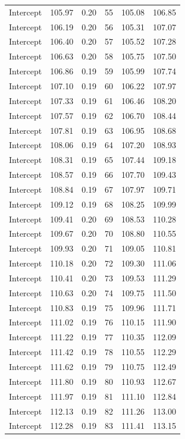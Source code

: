 \documentclass[
]{article}
\begin{document}
\begin{longtable}[]{@{}lrrrrr@{}}
Intercept & 105.97 & 0.20 & 55 & 105.08 & 106.85 \\
Intercept & 106.19 & 0.20 & 56 & 105.31 & 107.07 \\
Intercept & 106.40 & 0.20 & 57 & 105.52 & 107.28 \\
Intercept & 106.63 & 0.20 & 58 & 105.75 & 107.50 \\
Intercept & 106.86 & 0.19 & 59 & 105.99 & 107.74 \\
Intercept & 107.10 & 0.19 & 60 & 106.22 & 107.97 \\
Intercept & 107.33 & 0.19 & 61 & 106.46 & 108.20 \\
Intercept & 107.57 & 0.19 & 62 & 106.70 & 108.44 \\
Intercept & 107.81 & 0.19 & 63 & 106.95 & 108.68 \\
Intercept & 108.06 & 0.19 & 64 & 107.20 & 108.93 \\
Intercept & 108.31 & 0.19 & 65 & 107.44 & 109.18 \\
Intercept & 108.57 & 0.19 & 66 & 107.70 & 109.43 \\
Intercept & 108.84 & 0.19 & 67 & 107.97 & 109.71 \\
Intercept & 109.12 & 0.19 & 68 & 108.25 & 109.99 \\
Intercept & 109.41 & 0.20 & 69 & 108.53 & 110.28 \\
Intercept & 109.67 & 0.20 & 70 & 108.80 & 110.55 \\
Intercept & 109.93 & 0.20 & 71 & 109.05 & 110.81 \\
Intercept & 110.18 & 0.20 & 72 & 109.30 & 111.06 \\
Intercept & 110.41 & 0.20 & 73 & 109.53 & 111.29 \\
Intercept & 110.63 & 0.20 & 74 & 109.75 & 111.50 \\
Intercept & 110.83 & 0.19 & 75 & 109.96 & 111.71 \\
Intercept & 111.02 & 0.19 & 76 & 110.15 & 111.90 \\
Intercept & 111.22 & 0.19 & 77 & 110.35 & 112.09 \\
Intercept & 111.42 & 0.19 & 78 & 110.55 & 112.29 \\
Intercept & 111.62 & 0.19 & 79 & 110.75 & 112.49 \\
Intercept & 111.80 & 0.19 & 80 & 110.93 & 112.67 \\
Intercept & 111.97 & 0.19 & 81 & 111.10 & 112.84 \\
Intercept & 112.13 & 0.19 & 82 & 111.26 & 113.00 \\
Intercept & 112.28 & 0.19 & 83 & 111.41 & 113.15 \\

\end{longtable}
\end{document}
